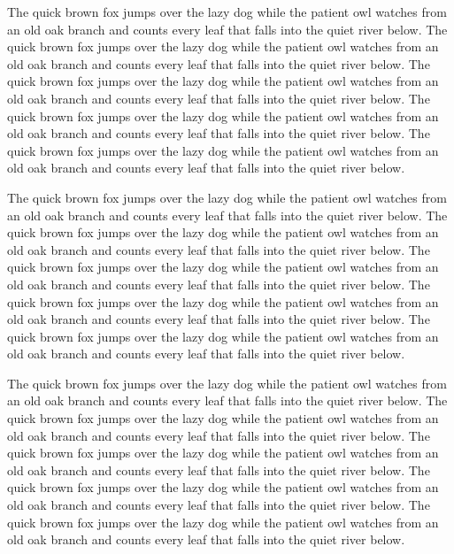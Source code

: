The quick brown fox jumps over the lazy dog while the patient owl watches from an old oak branch and counts every leaf that falls into the quiet river below. The quick brown fox jumps over the lazy dog while the patient owl watches from an old oak branch and counts every leaf that falls into the quiet river below. The quick brown fox jumps over the lazy dog while the patient owl watches from an old oak branch and counts every leaf that falls into the quiet river below. The quick brown fox jumps over the lazy dog while the patient owl watches from an old oak branch and counts every leaf that falls into the quiet river below. The quick brown fox jumps over the lazy dog while the patient owl watches from an old oak branch and counts every leaf that falls into the quiet river below.

The quick brown fox jumps over the lazy dog while the patient owl watches from an old oak branch and counts every leaf that falls into the quiet river below. The quick brown fox jumps over the lazy dog while the patient owl watches from an old oak branch and counts every leaf that falls into the quiet river below. The quick brown fox jumps over the lazy dog while the patient owl watches from an old oak branch and counts every leaf that falls into the quiet river below. The quick brown fox jumps over the lazy dog while the patient owl watches from an old oak branch and counts every leaf that falls into the quiet river below. The quick brown fox jumps over the lazy dog while the patient owl watches from an old oak branch and counts every leaf that falls into the quiet river below.

The quick brown fox jumps over the lazy dog while the patient owl watches from an old oak branch and counts every leaf that falls into the quiet river below. The quick brown fox jumps over the lazy dog while the patient owl watches from an old oak branch and counts every leaf that falls into the quiet river below. The quick brown fox jumps over the lazy dog while the patient owl watches from an old oak branch and counts every leaf that falls into the quiet river below. The quick brown fox jumps over the lazy dog while the patient owl watches from an old oak branch and counts every leaf that falls into the quiet river below. The quick brown fox jumps over the lazy dog while the patient owl watches from an old oak branch and counts every leaf that falls into the quiet river below.

